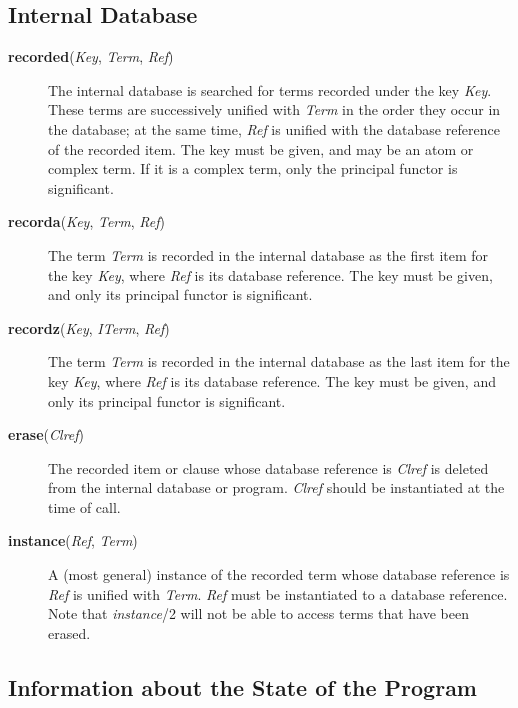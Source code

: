 \subsection{Internal Database}\label{internal_database}
 
\begin{description}
\item[{\bf recorded}({\em Key}, {\em Term}, {\em Ref})]
    The internal database is searched for terms recorded under the key
    {\em Key}.
    These terms are successively unified with {\em Term} in the
    order they occur in the database; at the same time, {\em Ref} is unified
    with the database reference of the recorded item.
    The key must be given, and may be an atom or complex term.
    If it is a complex term, only the principal functor is significant.

\item[{\bf recorda}({\em Key}, {\em Term}, {\em Ref})]
    The term {\em Term} is recorded in the internal database as the first item
    for the key {\em Key}, where {\em Ref} is its database reference.
    The key must be given, and only its principal functor is significant.

\item[{\bf recordz}({\em Key}, {\em ITerm}, {\em Ref})]
    The term {\em Term} is recorded in the internal database as the last item
    for the key {\em Key}, where {\em Ref} is its database reference.
    The key must be given, and only its principal functor is significant.

\item[{\bf erase}({\em Clref})] 
    The recorded item or clause whose database reference is {\em Clref} is
    deleted from the internal database or program.
    {\em Clref} should be instantiated at the time of call.

\item[{\bf instance}({\em Ref}, {\em Term})] 
    A (most general) instance of the recorded term whose database reference is
    {\em Ref} is unified with {\em Term}.
    {\em Ref} must be instantiated to a database reference.
    Note that {\em instance}/2 will not be able to access
    terms that have been erased.
\end{description}

\subsection{Information about the State of the Program}
 

